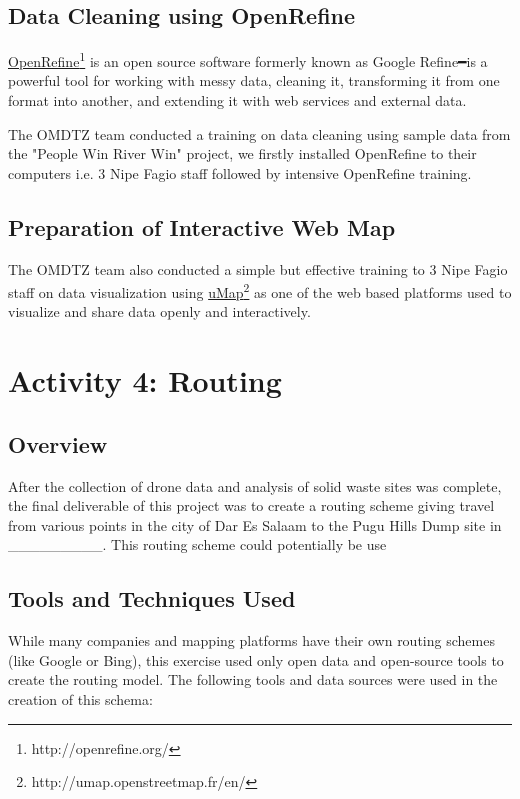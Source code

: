 \documentclass[a4paper,12pt,twoside]{article}
\begin{document}
\subsection{Data Cleaning using OpenRefine}

    \href{http://openrefine.org/}{OpenRefine}\footnote{http://openrefine.org/} is an open source software formerly known as Google Refine━is a powerful tool for working with messy data, cleaning it, transforming it from one format into another, and extending it with web services and external data.

    The OMDTZ team conducted a training on data cleaning using sample data from the "People Win River Win" project,  we firstly installed OpenRefine to their computers i.e. 3 Nipe Fagio staff followed by intensive OpenRefine training. 
\subsection{Preparation of Interactive Web Map}

    The OMDTZ team also conducted a simple but effective training to 3 Nipe Fagio staff on data visualization using \href{http://umap.openstreetmap.fr/en/}{uMap}\footnote{http://umap.openstreetmap.fr/en/}  as one of the  web based platforms used to visualize and share data openly and interactively.

\section{Activity 4: Routing}

\subsection{Overview}
    After the collection of drone data and analysis of solid waste sites was complete, the final deliverable of this project was to create a routing scheme giving travel from various points in the city of Dar Es Salaam to the Pugu Hills Dump site in _________.  This routing scheme could potentially be use

\subsection{Tools and Techniques Used}
    While many companies and mapping platforms have their own routing schemes (like Google or Bing), this exercise used only open data and open-source tools to create the routing model. The following tools and data sources were used in the creation of this schema:
    
\end{document}
